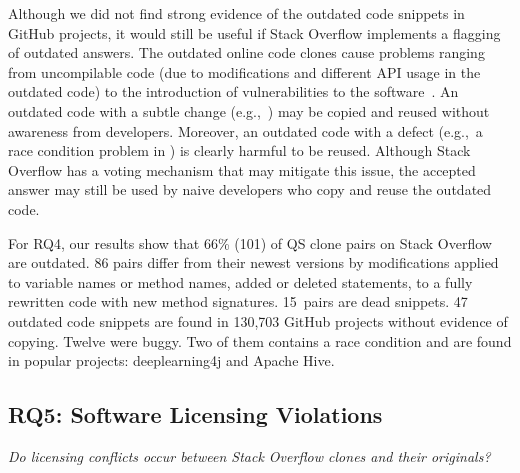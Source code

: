 \documentclass[10pt,journal,compsoc]{IEEEtran}
\newenvironment{boxquote}{\vspace{-1ex}\setlength{\FrameSep}{1\fboxsep}\begin{framed}\setlength{\parskip}{0.5\baselineskip}\setlength{\parindent}{0pt}}{\end{framed}}
\begin{document}
Although we did not find strong evidence of the outdated code snippets in GitHub
projects, it would still be useful if Stack Overflow implements a flagging of
outdated answers. The outdated online code clones cause problems ranging from
uncompilable code (due to modifications and different API usage in the outdated
code) to the introduction of vulnerabilities to the software~\cite{Xia2014}. An
outdated code with a subtle change (e.g.,\ ) may be copied
and reused without awareness from developers. Moreover, an outdated code with a
defect (e.g.,\ a race condition problem in ) is clearly
harmful to be reused. Although Stack Overflow has a voting mechanism that may
mitigate this issue, the accepted answer may still be used by naive developers
who copy and reuse the outdated code.

\begin{boxquote}
For RQ4, our results show that 66\% (101) of QS clone pairs on Stack
Overflow are outdated. 86 pairs differ from their newest versions by
modifications applied to variable names or method names, added or deleted
statements, to a fully rewritten code with new method signatures. 15~pairs are
dead snippets. 47 outdated code snippets are found in 130,703 GitHub projects
without evidence of copying. Twelve were buggy. Two of them contains a race condition and
are found in popular projects: deeplearning4j and Apache Hive.
\end{boxquote}

\subsection{RQ5: Software Licensing Violations}
\vspace{0.25cm}
\textit{Do
	licensing conflicts occur between Stack Overflow clones and their
	originals?}
\vspace{0.25cm}
\end{document}
